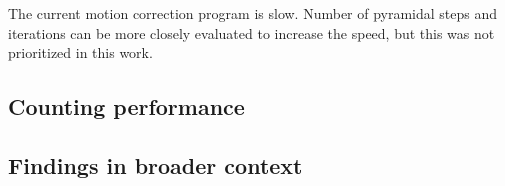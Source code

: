 The current motion correction program is slow. Number of pyramidal steps and iterations can be more closely evaluated to increase the speed, but this was not prioritized in this work. 

\subsection{Counting performance}
\subsection{Findings in broader context}


